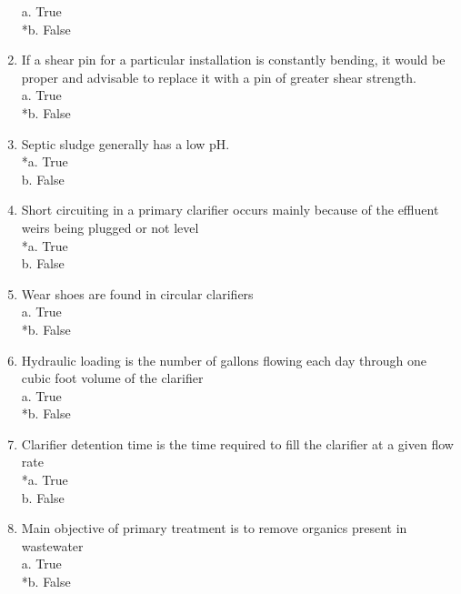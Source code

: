 \begin{enumerate}
a. True \\
*b. False \\


\item  If a shear pin for a particular installation is constantly bending, it would be proper and advisable to replace it with a pin of greater shear strength. \\

a. True \\
*b. False \\


\item  Septic sludge generally has a low pH. \\

*a. True \\
b. False \\


\item  Short circuiting in a primary clarifier occurs mainly because of the effluent weirs being plugged or not level \\

*a. True \\
b. False \\


\item  Wear shoes are found in circular clarifiers \\

a. True \\
*b. False \\


\item  Hydraulic loading is the number of gallons flowing each day through one cubic foot volume of the clarifier \\

a. True \\
*b. False \\


\item  Clarifier detention time is the time required to fill the clarifier at a given flow rate \\

*a. True \\
b. False \\


\item  Main objective of primary treatment is to remove organics present in wastewater \\

a. True \\
*b. False \\



\end{enumerate}
